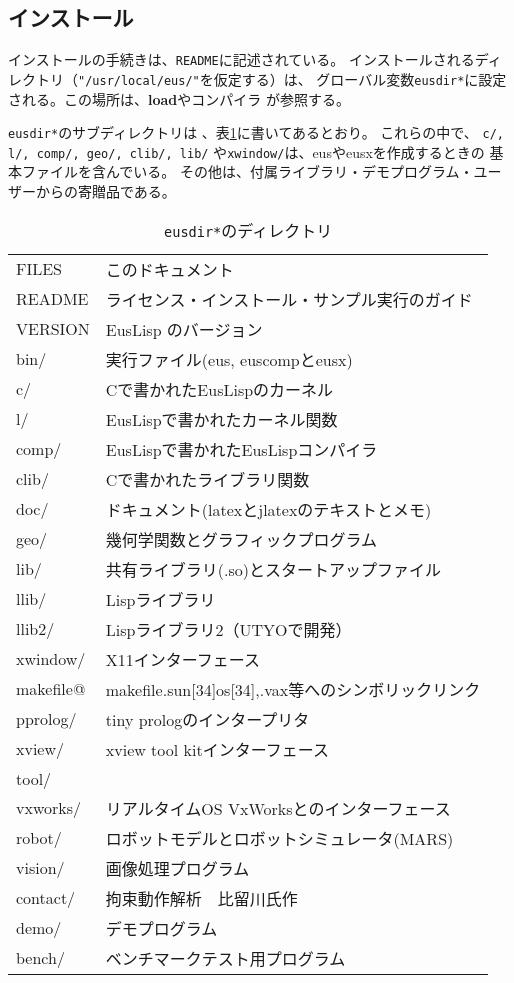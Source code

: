 \subsection{インストール}
インストールの手続きは、{\tt README}に記述されている。
インストールされるディレクトリ（{\tt "/usr/local/eus/"}を仮定する）は、
グローバル変数{\tt *eusdir*}に設定される。この場所は、{\bf load}やコンパイラ
が参照する。

{\tt *eusdir*}のサブディレクトリは 、表\ref{Directories}に書いてあるとおり。
これらの中で、
{\tt c/, l/, comp/, geo/, clib/, lib/} や{\tt xwindow/}は、eusやeusxを作成するときの
基本ファイルを含んでいる。
その他は、付属ライブラリ・デモプログラム・ユーザーからの寄贈品である。

\begin{table}
\caption{\label{Directories}{\tt *eusdir*}のディレクトリ}
\begin{center}
{\footnotesize
\begin{tabular}{|l | l|}\hline 
FILES &  このドキュメント \\
README &  ライセンス・インストール・サンプル実行のガイド\\
VERSION &  EusLisp のバージョン\\
bin/ &  実行ファイル(eus, euscompとeusx)\\
c/ &  Cで書かれたEusLispのカーネル\\
l/ &  EusLispで書かれたカーネル関数\\
comp/ &  EusLispで書かれたEusLispコンパイラ\\
clib/ &  Cで書かれたライブラリ関数\\
doc/ &  ドキュメント(latexとjlatexのテキストとメモ)\\
geo/ &  幾何学関数とグラフィックプログラム\\
lib/ & 共有ライブラリ(.so)とスタートアップファイル\\
llib/ &  Lispライブラリ\\
llib2/ &  Lispライブラリ2（UTYOで開発）\\
xwindow/ &  X11インターフェース\\
makefile@ &  makefile.sun[34]os[34],.vax等へのシンボリックリンク\\
pprolog/ &  tiny prologのインタープリタ\\
xview/ &  xview tool kitインターフェース\\
tool/ & \\
vxworks/ & リアルタイムOS VxWorksとのインターフェース\\
robot/ & ロボットモデルとロボットシミュレータ(MARS)\\
vision/ &  画像処理プログラム\\
contact/ & 拘束動作解析　比留川氏作
\cite{Hirukawa:1991a,Hirukawa:1991b,Hirukawa:1991c}\\
demo/ &  デモプログラム\\
bench/ &  ベンチマークテスト用プログラム\\ \hline
\end{tabular}
}
\end{center}
\end{table}

